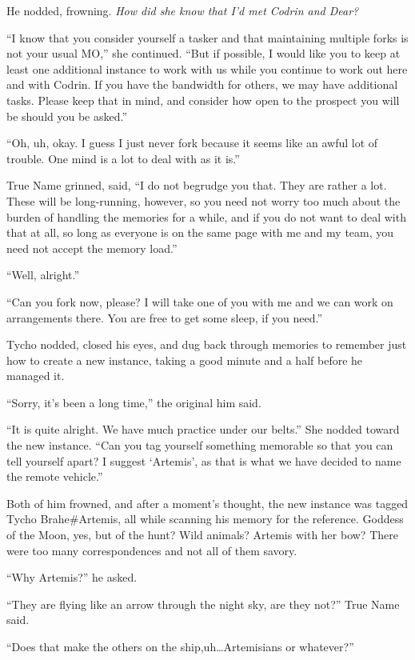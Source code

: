 He nodded, frowning. \emph{How did she know that I'd met Codrin and Dear?}

``I know that you consider yourself a tasker and that maintaining multiple forks is not your usual MO,'' she continued. ``But if possible, I would like you to keep at least one additional instance to work with us while you continue to work out here and with Codrin. If you have the bandwidth for others, we may have additional tasks. Please keep that in mind, and consider how open to the prospect you will be should you be asked.''

``Oh, uh, okay. I guess I just never fork because it seems like an awful lot of trouble. One mind is a lot to deal with as it is.''

True Name grinned, said, ``I do not begrudge you that. They are rather a lot. These will be long-running, however, so you need not worry too much about the burden of handling the memories for a while, and if you do not want to deal with that at all, so long as everyone is on the same page with me and my team, you need not accept the memory load.''

``Well, alright.''

``Can you fork now, please? I will take one of you with me and we can work on arrangements there. You are free to get some sleep, if you need.''

Tycho nodded, closed his eyes, and dug back through memories to remember just how to create a new instance, taking a good minute and a half before he managed it.

``Sorry, it's been a long time,'' the original him said.

``It is quite alright. We have much practice under our belts.'' She nodded toward the new instance. ``Can you tag yourself something memorable so that you can tell yourself apart? I suggest `Artemis', as that is what we have decided to name the remote vehicle.''

Both of him frowned, and after a moment's thought, the new instance was tagged Tycho Brahe\#Artemis, all while scanning his memory for the reference. Goddess of the Moon, yes, but of the hunt? Wild animals? Artemis with her bow? There were too many correspondences and not all of them savory.

``Why Artemis?'' he asked.

``They are flying like an arrow through the night sky, are they not?'' True Name said.

``Does that make the others on the ship,uh\ldots{}Artemisians or whatever?''

